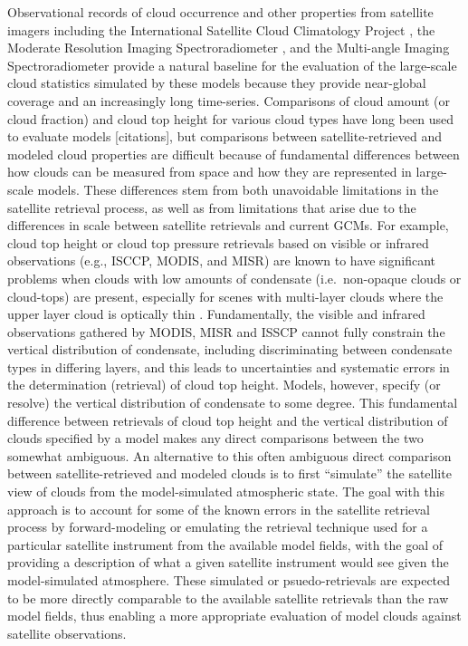 Observational records of cloud occurrence and other properties from
satellite imagers including the International Satellite Cloud
Climatology Project \citep[ISCCP][]{rossow_and_schiffer_1999}, the
Moderate Resolution Imaging Spectroradiometer
\citep[MODIS][]{king_et_al_2003}, and the Multi-angle Imaging
Spectroradiometer \citep[MISR][]{diner_et_al_2002, diner_et_al_2005}
provide a natural baseline for the evaluation of the large-scale cloud
statistics simulated by these models because they provide near-global
coverage and an increasingly long time-series. Comparisons of cloud
amount (or cloud fraction) and cloud top height for various cloud types
have long been used to evaluate models {[}citations{]}, but comparisons
between satellite-retrieved and modeled cloud properties are difficult
because of fundamental differences between how clouds can be measured
from space and how they are represented in large-scale models. These
differences stem from both unavoidable limitations in the satellite
retrieval process, as well as from limitations that arise due to the
differences in scale between satellite retrievals and current GCMs. For
example, cloud top height or cloud top pressure retrievals based on
visible or infrared observations (e.g., ISCCP, MODIS, and MISR) are
known to have significant problems when clouds with low amounts of
condensate (i.e.~non-opaque clouds or cloud-tops) are present,
especially for scenes with multi-layer clouds where the upper layer
cloud is optically thin \citep{marchand_et_al_2010, pincus_et_al_2012}.
Fundamentally, the visible and infrared observations gathered by MODIS,
MISR and ISSCP cannot fully constrain the vertical distribution of
condensate, including discriminating between condensate types in
differing layers, and this leads to uncertainties and systematic errors
in the determination (retrieval) of cloud top height. Models, however,
specify (or resolve) the vertical distribution of condensate to some
degree. This fundamental difference between retrievals of cloud top
height and the vertical distribution of clouds specified by a model
makes any direct comparisons between the two somewhat ambiguous. An
alternative to this often ambiguous direct comparison between
satellite-retrieved and modeled clouds is to first ``simulate'' the
satellite view of clouds from the model-simulated atmospheric state. The
goal with this approach is to account for some of the known errors in
the satellite retrieval process by forward-modeling or emulating the
retrieval technique used for a particular satellite instrument from the
available model fields, with the goal of providing a description of what
a given satellite instrument would see given the model-simulated
atmosphere. These simulated or psuedo-retrievals are expected to be more
directly comparable to the available satellite retrievals than the raw
model fields, thus enabling a more appropriate evaluation of model
clouds against satellite observations.

